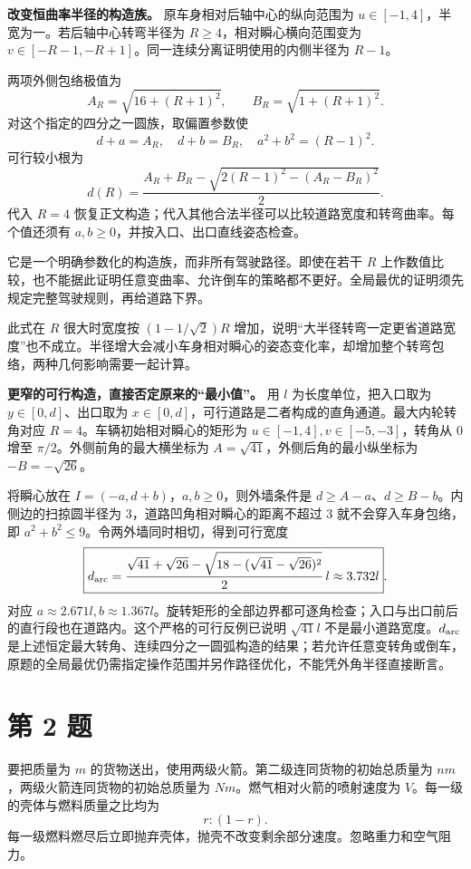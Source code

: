 \documentclass[12pt,a4paper,UTF8]{ctexart}
\begin{document}
\textbf{改变恒曲率半径的构造族。} 原车身相对后轴中心的纵向范围为
\(u\in[-1,4]\)，半宽为一。若后轴中心转弯半径为
\(R\ge4\)，相对瞬心横向范围变为
\(v\in[-R-1,-R+1]\)。同一连续分离证明使用的内侧半径为 \(R-1\)。

两项外侧包络极值为 \[
A_R=\sqrt{16+(R+1)^2},
\qquad B_R=\sqrt{1+(R+1)^2}.
\] 对这个指定的四分之一圆族，取偏置参数使 \[
d+a=A_R,\quad d+b=B_R,\quad a^2+b^2=(R-1)^2.
\] 可行较小根为 \[
d(R)=\frac{A_R+B_R-\sqrt{2(R-1)^2-(A_R-B_R)^2}}2.
\] 代入 \(R=4\)
恢复正文构造；代入其他合法半径可以比较道路宽度和转弯曲率。每个值还须有
\(a,b\ge0\)，并按入口、出口直线姿态检查。

它是一个明确参数化的构造族，而非所有驾驶路径。即使在若干 \(R\)
上作数值比较，也不能据此证明任意变曲率、允许倒车的策略都不更好。全局最优的证明须先规定完整驾驶规则，再给道路下界。

此式在 \(R\) 很大时宽度按 \((1-1/\sqrt2)R\)
增加，说明``大半径转弯一定更省道路宽度''也不成立。半径增大会减小车身相对瞬心的姿态变化率，却增加整个转弯包络，两种几何影响需要一起计算。

\textbf{更窄的可行构造，直接否定原来的``最小值''。} 用 \(l\)
为长度单位，把入口取为 \(y\in[0,d]\)、出口取为
\(x\in[0,d]\)，可行道路是二者构成的直角通道。最大内轮转角对应
\(R=4\)。车辆初始相对瞬心的矩形为 \(u\in[-1,4],v\in[-5,-3]\)，转角从
\(0\) 增至 \(\pi/2\)。外侧前角的最大横坐标为
\(A=\sqrt{41}\)，外侧后角的最小纵坐标为 \(-B=-\sqrt{26}\)。

将瞬心放在 \(I=(-a,d+b)\)，\(a,b\ge0\)，则外墙条件是
\(d\ge A-a\)、\(d\ge B-b\)。内侧边的扫掠圆半径为
\(3\)，道路凹角相对瞬心的距离不超过 \(3\) 就不会穿入车身包络，即
\(a^2+b^2\le9\)。令两外墙同时相切，得到可行宽度 \[
\boxed{d_{\rm arc}=
\frac{\sqrt{41}+\sqrt{26}-
\sqrt{18-(\sqrt{41}-\sqrt{26})^2}}2\,l
\approx3.732l}.
\] 对应
\(a\approx2.671l,b\approx1.367l\)。旋转矩形的全部边界都可逐角检查；入口与出口前后的直行段也在道路内。这个严格的可行反例已说明
\(\sqrt{41}l\) 不是最小道路宽度。\(d_{\rm arc}\)
是上述恒定最大转角、连续四分之一圆弧构造的结果；若允许任意变转角或倒车，原题的全局最优仍需指定操作范围并另作路径优化，不能凭外角半径直接断言。

\newpage

\section{第 2 题}\label{ux7b2c-2-ux9898}

要把质量为 \(m\) 的货物送出，使用两级火箭。第二级连同货物的初始总质量为
\(nm\)，两级火箭连同货物的初始总质量为 \(Nm\)。燃气相对火箭的喷射速度为
\(V\)。每一级的壳体与燃料质量之比均为 \[
r:(1-r).
\]
每一级燃料燃尽后立即抛弃壳体，抛壳不改变剩余部分速度。忽略重力和空气阻力。
\end{document}
